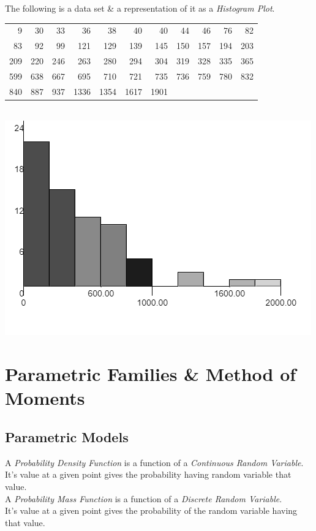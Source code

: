 \documentclass[11pt,a4paper]{article}
\begin{document}
The following is a data set \& a representation of it as a \textit{Histogram Plot}.\\
\begin{tabular}{rrrrrrrrrrr}
9&30&33&36&38&40&40&44&46&76&82\\
83&92&99&121&129&139&145&150&157&194&203\\
209&220&246&263&280&294&304&319&328&335&365\\
599&638&667&695&710&721&735&736&759&780&832\\
840&887&937&1336&1354&1617&1901
\end{tabular}\\
\includegraphics[scale=0.3]{img/histogram.png}

\section{Parametric Families \& Method of Moments}

\subsection{Parametric Models}

A \textit{Probability Density Function} is a function of a \textit{Continuous Random Variable}.\\
It's value at a given point gives the probability having random variable that value.\\

A \textit{Probability Mass Function} is a function of a \textit{Discrete Random Variable}.\\
It's value at a given point gives the probability of the random variable having that value.\\
\end{document}
